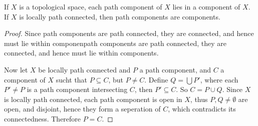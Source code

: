 \begin{theorem}\label{3.3.8}
    If $X$ is a topological space, each path component of  $X$ lies in a component of $X$. If $X$ is
    locally path connected, then path components are components.
\end{theorem}
\begin{proof}
    Since path components are path connected, they are connected, and hence must lie within
    componenpath components are path connected, they are connected, and hence must lie within
    components.

    Now let $X$ be locally path connected and  $P$ a path component, and  $C$ a component of  $X$
    sucht that  $P \subseteq C$, but  $P \neq C$. Define  $Q=\bigcup{P'}$, where each $P' \neq P$ is
    a path component intersecting  $C$, then  $P' \subseteq C$. So  $C=P \cup Q$. Since  $X$ is
    locally path connected, each path component is open in  $X$, thus  $P,Q \neq \emptyset$ are
    open, and disjoint, hence they form a seperation of $C$, which contradicts its connectedness.
    Therefore  $P=C$.
\end{proof}
